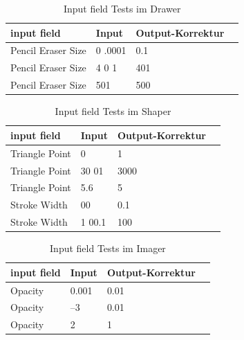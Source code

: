 \begin{table}[!htbp]
	\centering
	\begin{tabular}{|p{4cm}|p{3cm}|p{3cm}|p{3cm}|}
		\hline
		\textbf{input field}			& \textbf{Input} 			& \textbf{Output-Korrektur}		\\ 
		\hline
		Pencil Eraser Size 					& 0 .0001					& 0.1  						\\
		Pencil Eraser Size					& 4 0 1 					& 401						\\ 
		Pencil Eraser Size					& 501 						& 500						\\ 
		\hline
	\end{tabular}
	\caption{Input field Tests im Drawer}
	\label{table:draw-input}
\end{table}

\begin{table}[!htbp]
	\centering
	\begin{tabular}{|p{4cm}|p{3cm}|p{3cm}|p{3cm}|}
		\hline
		\textbf{input field}			& \textbf{Input} 			& \textbf{Output-Korrektur}	\\ 
		\hline
		Triangle Point 					& 0							& 1  						\\
		Triangle Point					& 30 01 					& 3000						\\ 
		Triangle Point					& 5.6 						& 5							\\ 
		Stroke Width 					& 00						& 0.1  						\\
		Stroke Width					& 1 00.1 					& 100						\\ 
		\hline
	\end{tabular}
	\caption{Input field Tests im Shaper}
	\label{table:shape-input}
\end{table}

\begin{table}[!htbp]
	\centering
	\begin{tabular}{|p{4cm}|p{3cm}|p{3cm}|p{3cm}|}
		\hline
		\textbf{input field}		& \textbf{Input} 			& \textbf{Output-Korrektur}	\\ 
		\hline
		Opacity 					& 0.001						& 0.01  					\\
		Opacity						& –3 						& 0.01						\\ 
		Opacity						& 2 						& 1							\\ 
		\hline
	\end{tabular}
	\caption{Input field Tests im Imager}
	\label{table:img-input}
\end{table}

